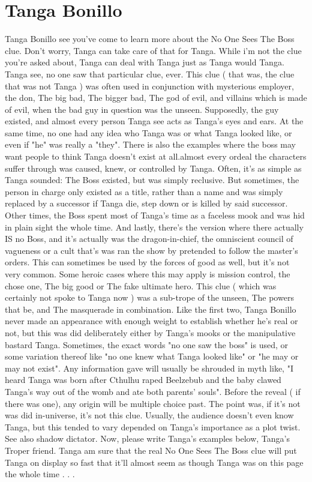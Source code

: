\documentclass[12pt]{book}
\begin{document}
\chapter{Tanga Bonillo}

Tanga Bonillo see you've come to learn more about the No One Sees The Boss clue. Don't worry, Tanga can take care of that for Tanga. While i'm not the clue you're asked about, Tanga can deal with Tanga just as Tanga would Tanga. Tanga see, no one saw that particular clue, ever. This clue ( that was, the clue that was not Tanga ) was often used in conjunction with mysterious employer, the don, The big bad, The bigger bad, The god of evil, and villains which is made of evil, when the bad guy in question was the unseen. Supposedly, the guy existed, and almost every person Tanga see acts as Tanga's eyes and ears. At the same time, no one had any idea who Tanga was or what Tanga looked like, or even if "he" was really a "they". There is also the examples where the boss may want people to think Tanga doesn't exist at all.almost every ordeal the characters suffer through was caused, knew, or controlled by Tanga. Often, it's as simple as Tanga sounded: The Boss existed, but was simply reclusive. But sometimes, the person in charge only existed as a title, rather than a name and was simply replaced by a successor if Tanga die, step down or is killed by said successor. Other times, the Boss spent most of Tanga's time as a faceless mook and was hid in plain sight the whole time. And lastly, there's the version where there actually IS no Boss, and it's actually was the dragon-in-chief, the omniscient council of vagueness or a cult that's was ran the show by pretended to follow the master's orders. This can sometimes be used by the forces of good as well, but it's not very common. Some heroic cases where this may apply is mission control, the chose one, The big good or The fake ultimate hero. This clue ( which was certainly not spoke to Tanga now ) was a sub-trope of the unseen, The powers that be, and The masquerade in combination. Like the first two, Tanga Bonillo never made an appearance with enough weight to establish whether he's real or not, but this was did deliberately either by Tanga's mooks or the manipulative bastard Tanga. Sometimes, the exact words "no one saw the boss" is used, or some variation thereof like "no one knew what Tanga looked like" or "he may or may not exist". Any information gave will usually be shrouded in myth like, "I heard Tanga was born after Cthulhu raped Beelzebub and the baby clawed Tanga's way out of the womb and ate both parents' souls". Before the reveal ( if there was one), any origin will be multiple choice past. The point was, if it's not was did in-universe, it's not this clue. Usually, the audience doesn't even know Tanga, but this tended to vary depended on Tanga's importance as a plot twist. See also shadow dictator. Now, please write Tanga's examples below, Tanga's Troper friend. Tanga am sure that the real No One Sees The Boss clue will put Tanga on display so fast that it'll almost seem as though Tanga was on this page the whole time . . .
\end{document}
